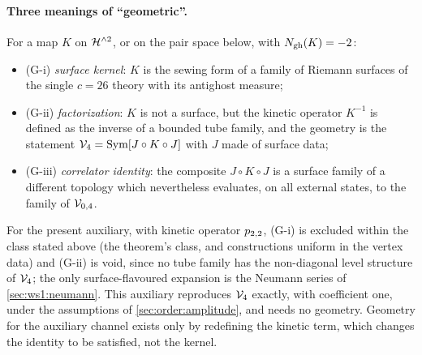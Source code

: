 \paragraph{Three meanings of \enquote{geometric}.}
For a map $K$ on $\mathcal{H}^{\wedge 2}$, or on the pair space below, with $N_{\text{gh}}(K) = - 2$:
\begin{itemize}
  \setlength{\itemsep}{0.5ex}
  \item (G-i) \emph{surface kernel}: $K$ is the sewing form of a family of Riemann surfaces of the single $c = 26$ theory with its antighost measure;
  \item (G-ii) \emph{factorization}: $K$ is not a surface, but the kinetic operator $K^{-1}$ is defined as the inverse of a bounded tube family, and the geometry is the statement $\mathcal{V}_{4} = \operatorname{Sym}[J \circ K \circ J]$ with $J$ made of surface data;
  \item (G-iii) \emph{correlator identity}: the composite $J \circ K \circ J$ is a surface family of a different topology which nevertheless evaluates, on all external states, to the family of ${\mathcal{V}}_{0, 4}$.
\end{itemize}
For the present auxiliary, with kinetic operator $p_{2,2}$, (G-i) is excluded within the class stated above (the theorem's class, and constructions uniform in the vertex data) and (G-ii) is void, since no tube family has the non-diagonal level structure of $\mathcal{V}_{4}$; the only surface-flavoured expansion is the Neumann series of \cref{sec:ws1:neumann}.
This auxiliary reproduces $\mathcal{V}_{4}$ exactly, with coefficient one, under the assumptions of \cref{sec:order:amplitude}, and needs no geometry.
Geometry for the auxiliary channel exists only by redefining the kinetic term, which changes the identity to be satisfied, not the kernel.


